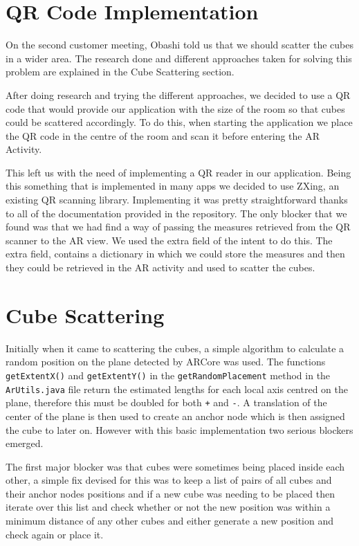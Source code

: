\documentclass{l3proj}
\begin{document}
\section{QR Code Implementation}
On the second customer meeting, Obashi told us that we should scatter the
cubes in a wider area. The research done and different approaches taken
for solving this problem are explained in the Cube Scattering section. %

After doing research and trying the different approaches, we decided to
use a QR code that would provide our application with the size of
the room so that cubes could be scattered accordingly. To do this,
when starting the application we place the QR code in the centre of
the room and scan it before entering the AR Activity.

This left us with the need of implementing a QR reader in our application.
Being this something that is implemented in many apps we decided to use
ZXing\cite{ZXing}, an existing QR scanning library. Implementing it was
pretty straightforward thanks to all of the documentation provided in
the repository. The only blocker that we found was that we had find a
way of passing the measures retrieved from the QR scanner to the AR view.
We used the extra field of the intent to do this. The extra field,
contains a dictionary in which we could store the measures and then
they could be retrieved in the AR activity and used to scatter the
cubes.

\section{Cube Scattering}
Initially when it came to scattering the cubes, a simple algorithm to calculate a random position on the plane detected by ARCore was used. The functions \verb|getExtentX()| and \verb|getExtentY()| in the \verb|getRandomPlacement| method in the \verb|ArUtils.java| file return the estimated lengths for each local axis centred on the plane, therefore this must be doubled for both \verb|+| and \verb|-|. A translation of the center of the plane is then used to create an anchor node which is then assigned the cube to later on. However with this basic implementation two serious blockers emerged.

The first major blocker was that cubes were sometimes being placed inside each other, a simple fix devised for this was to keep a list of pairs of all cubes and their anchor nodes positions and if a new cube was needing to be placed then iterate over this list and check whether or not the new position was within a minimum distance of any other cubes and either generate a new position and check again or place it.
\end{document}
